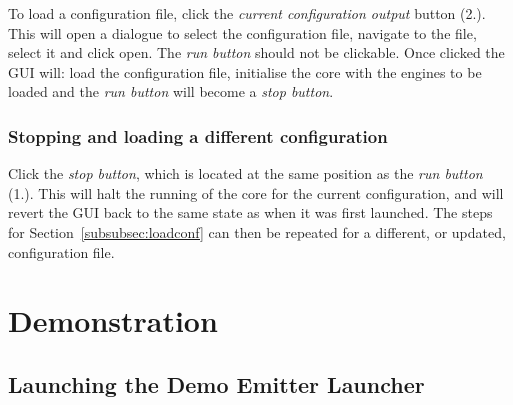 \documentclass[10pt,a4paper]{article}
\begin{document}
To load a configuration file, click the \emph{current configuration output} button (2.). This will open a dialogue to select the configuration file, navigate to the file, select it and click open. The \emph{run button} should not be clickable. Once clicked the GUI will: load the configuration file, initialise the core with the engines to be loaded and the \emph{run button} will become a \emph{stop button}.

\subsubsection{Stopping and loading a different configuration}

Click the \emph{stop button}, which is located at the same position as the \emph{run button} (1.). This will halt the running of the core for the current configuration, and will revert the GUI back to the same state as when it was first launched. The steps for Section~\ref{subsubsec:loadconf} can then be repeated for a different, or updated, configuration file.

\section{Demonstration}
\label{subsec:demo}
\subsection{Launching the Demo Emitter Launcher}
\end{document}
